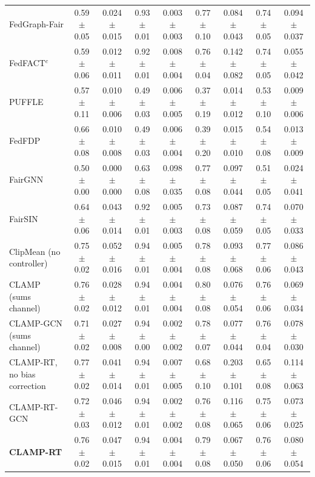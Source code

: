 \begin{table}[tbp]
{\begin{tabular}{lcccccccc}
FedGraph-Fair & 0.59$\pm$0.05 & 0.024$\pm$0.015 & 0.93$\pm$0.01 & 0.003$\pm$0.003 & 0.77$\pm$0.10 & 0.084$\pm$0.043 & 0.74$\pm$0.05 & 0.094$\pm$0.037 \\
FedFACT$^{c}$ & 0.59$\pm$0.06 & 0.012$\pm$0.011 & 0.92$\pm$0.01 & 0.008$\pm$0.004 & 0.76$\pm$0.04 & 0.142$\pm$0.082 & 0.74$\pm$0.05 & 0.055$\pm$0.042 \\
PUFFLE & 0.57$\pm$0.11 & 0.010$\pm$0.006 & 0.49$\pm$0.03 & 0.006$\pm$0.005 & 0.37$\pm$0.19 & 0.014$\pm$0.012 & 0.53$\pm$0.10 & 0.009$\pm$0.006 \\
FedFDP & 0.66$\pm$0.08 & 0.010$\pm$0.008 & 0.49$\pm$0.03 & 0.006$\pm$0.004 & 0.39$\pm$0.20 & 0.015$\pm$0.010 & 0.54$\pm$0.08 & 0.013$\pm$0.009 \\
FairGNN & 0.50$\pm$0.00 & 0.000$\pm$0.000 & 0.63$\pm$0.08 & 0.098$\pm$0.035 & 0.77$\pm$0.08 & 0.097$\pm$0.044 & 0.51$\pm$0.05 & 0.024$\pm$0.041 \\
FairSIN & 0.64$\pm$0.06 & 0.043$\pm$0.014 & 0.92$\pm$0.01 & 0.005$\pm$0.003 & 0.73$\pm$0.08 & 0.087$\pm$0.059 & 0.74$\pm$0.05 & 0.070$\pm$0.033 \\
ClipMean (no controller) & 0.75$\pm$0.02 & 0.052$\pm$0.016 & 0.94$\pm$0.01 & 0.005$\pm$0.004 & 0.78$\pm$0.08 & 0.093$\pm$0.068 & 0.77$\pm$0.06 & 0.086$\pm$0.043 \\
\midrule
CLAMP (sums channel) & 0.76$\pm$0.02 & 0.028$\pm$0.012 & 0.94$\pm$0.01 & 0.004$\pm$0.004 & 0.80$\pm$0.08 & 0.076$\pm$0.054 & 0.76$\pm$0.06 & 0.069$\pm$0.034 \\
CLAMP-GCN (sums channel) & 0.71$\pm$0.02 & 0.027$\pm$0.008 & 0.94$\pm$0.00 & 0.002$\pm$0.002 & 0.78$\pm$0.07 & 0.077$\pm$0.044 & 0.76$\pm$0.04 & 0.078$\pm$0.030 \\
\midrule
CLAMP-RT, no bias correction & 0.77$\pm$0.02 & 0.041$\pm$0.014 & 0.94$\pm$0.01 & 0.007$\pm$0.005 & 0.68$\pm$0.10 & 0.203$\pm$0.101 & 0.65$\pm$0.08 & 0.114$\pm$0.063 \\
CLAMP-RT-GCN & 0.72$\pm$0.03 & 0.046$\pm$0.012 & 0.94$\pm$0.01 & 0.002$\pm$0.002 & 0.76$\pm$0.08 & 0.116$\pm$0.065 & 0.75$\pm$0.06 & 0.073$\pm$0.025 \\
\textbf{CLAMP-RT} & 0.76$\pm$0.02 & 0.047$\pm$0.015 & 0.94$\pm$0.01 & 0.004$\pm$0.004 & 0.79$\pm$0.08 & 0.067$\pm$0.050 & 0.76$\pm$0.06 & 0.080$\pm$0.054 \\
\bottomrule
\end{tabular}}
\end{table}
